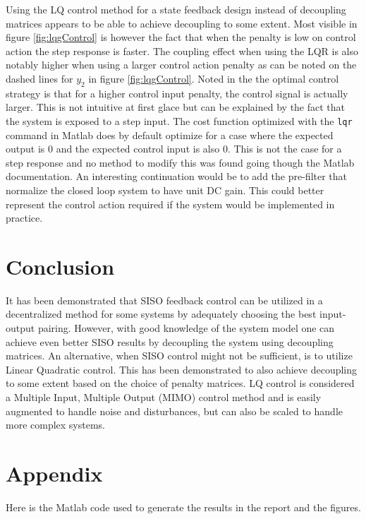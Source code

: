 \documentclass[a4paper, titlepage]{article}
\begin{document}
Using the LQ control method for a state feedback design instead of decoupling matrices appears to be able to achieve decoupling to some extent.
Most visible in figure \ref{fig:lqgControl} is however the fact that when the penalty is low on control action the step response is faster.
The coupling effect when using the LQR is also notably higher when using a larger control action penalty as can be noted on the dashed lines for $y_2$ in figure \ref{fig:lqgControl}.
Noted in the the optimal control strategy is that for a higher control input penalty, the control signal is actually larger.
This is not intuitive at first glace but can be explained by the fact that the system is exposed to a step input.
The cost function optimized with the \verb|lqr| command in Matlab does by default optimize for a case where the expected output is 0 and the expected control input is also 0.
This is not the case for a step response and no method to modify this was found going though the Matlab documentation.
An interesting continuation would be to add the pre-filter that normalize the closed loop system to have unit DC gain.
This could better represent the control action required if the system would be implemented in practice.

\section{Conclusion}

It has been demonstrated that SISO feedback control can be utilized in a decentralized method for some systems by adequately choosing the best input-output pairing.
However, with good knowledge of the system model one can achieve even better SISO results by decoupling the system using decoupling matrices.
An alternative, when SISO control might not be sufficient, is to utilize Linear Quadratic control.
This has been demonstrated to also achieve decoupling to some extent based on the choice of penalty matrices.
LQ control is considered a Multiple Input, Multiple Output (MIMO) control method and is easily augmented to handle noise and disturbances, but can also be scaled to handle more complex systems.



\clearpage


\clearpage
\appendix

\section{Appendix}
Here is the Matlab code used to generate the results in the report and the figures.


\end{document}
